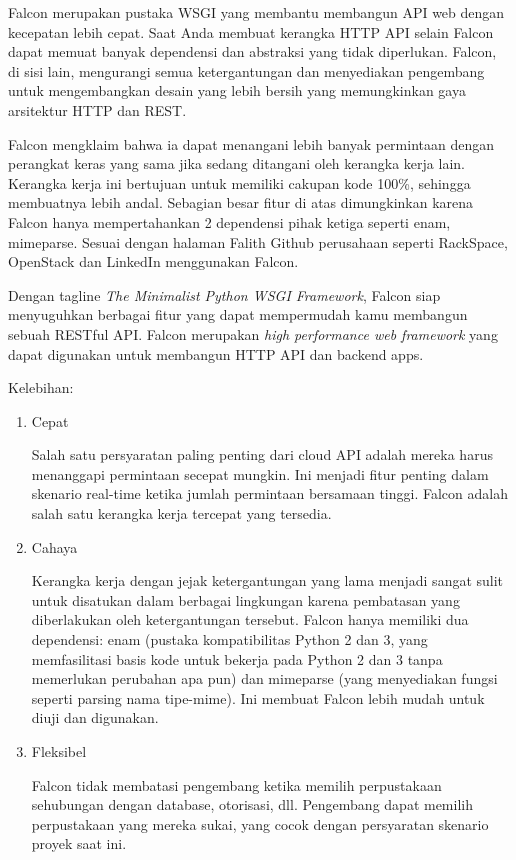 Falcon merupakan pustaka WSGI yang membantu membangun API web dengan kecepatan lebih cepat. Saat Anda membuat kerangka HTTP API selain Falcon dapat memuat banyak dependensi dan abstraksi yang tidak diperlukan. Falcon, di sisi lain, mengurangi semua ketergantungan dan menyediakan pengembang untuk mengembangkan desain yang lebih bersih yang memungkinkan gaya arsitektur HTTP dan REST\cite{azzahra2017karya}.

Falcon mengklaim bahwa ia dapat menangani lebih banyak permintaan dengan perangkat keras yang sama jika sedang ditangani oleh kerangka kerja lain. Kerangka kerja ini bertujuan untuk memiliki cakupan kode 100\%, sehingga membuatnya lebih andal. Sebagian besar fitur di atas dimungkinkan karena Falcon hanya mempertahankan 2 dependensi pihak ketiga seperti enam, mimeparse. Sesuai dengan halaman Falith Github perusahaan seperti RackSpace, OpenStack dan LinkedIn menggunakan Falcon.

Dengan tagline \textit{The Minimalist Python WSGI Framework}, Falcon siap menyuguhkan berbagai fitur yang dapat mempermudah kamu membangun sebuah RESTful API. Falcon merupakan \textit{high performance web framework} yang dapat digunakan untuk membangun HTTP API dan backend apps. %

Kelebihan:
\begin{enumerate}
\item Cepat

Salah satu persyaratan paling penting dari cloud API adalah mereka harus menanggapi permintaan secepat mungkin. Ini menjadi fitur penting dalam skenario real-time ketika jumlah permintaan bersamaan tinggi. Falcon adalah salah satu kerangka kerja tercepat yang tersedia.

\item Cahaya

Kerangka kerja dengan jejak ketergantungan yang lama menjadi sangat sulit untuk disatukan dalam berbagai lingkungan karena pembatasan yang diberlakukan oleh ketergantungan tersebut. Falcon hanya memiliki dua dependensi: enam (pustaka kompatibilitas Python 2 dan 3, yang memfasilitasi basis kode untuk bekerja pada Python 2 dan 3 tanpa memerlukan perubahan apa pun) dan mimeparse (yang menyediakan fungsi seperti parsing nama tipe-mime). Ini membuat Falcon lebih mudah untuk diuji dan digunakan.

\item Fleksibel

Falcon tidak membatasi pengembang ketika memilih perpustakaan sehubungan dengan database, otorisasi, dll. Pengembang dapat memilih perpustakaan yang mereka sukai, yang cocok dengan persyaratan skenario proyek saat ini.
\end{enumerate}


